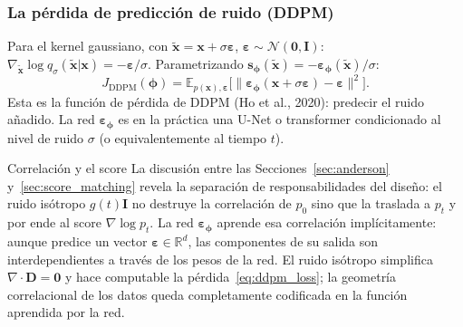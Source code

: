 \subsubsection*{La pérdida de predicción de ruido (DDPM)}

Para el kernel gaussiano, con $\tilde{\bm{x}} = \bm{x} + \sigma\bm{\varepsilon}$,
$\bm{\varepsilon}\sim\mathcal{N}(\bm{0},\bm{I})$:
$\nabla_{\tilde{\bm{x}}}\log q_\sigma(\tilde{\bm{x}}|\bm{x}) = -\bm{\varepsilon}/\sigma$.
Parametrizando $\bm{s}_{\bm{\phi}}(\tilde{\bm{x}}) =
-\bm{\varepsilon}_{\bm{\phi}}(\tilde{\bm{x}})/\sigma$:
\begin{equation}
  J_{\mathrm{DDPM}}(\bm{\phi})
  = \mathbb{E}_{p(\bm{x}),\bm{\varepsilon}}\bigl[
  \|\bm{\varepsilon}_{\bm{\phi}}(\bm{x}+\sigma\bm{\varepsilon})-\bm{\varepsilon}\|^2
  \bigr].
  \label{eq:ddpm_loss}
\end{equation}
Esta es la función de pérdida de DDPM (Ho et al., 2020): predecir el ruido
añadido. La red $\bm{\varepsilon}_{\bm{\phi}}$ es en la práctica una U-Net o
transformer condicionado al nivel de ruido $\sigma$ (o equivalentemente al
tiempo $t$).

\begin{observacion}{Correlación y el score}
La discusión entre las Secciones~\ref{sec:anderson} y~\ref{sec:score_matching}
revela la separación de responsabilidades del diseño: el ruido isótropo $g(t)\bm{I}$
no destruye la correlación de $p_0$ sino que la traslada a $p_t$ y por ende al
score $\nabla\log p_t$. La red $\bm{\varepsilon}_{\bm{\phi}}$ aprende esa
correlación implícitamente: aunque predice un vector $\bm{\varepsilon}\in
\mathbb{R}^d$, las componentes de su salida son interdependientes a través
de los pesos de la red. El ruido isótropo simplifica $\nabla\cdot\bm{D} =
\bm{0}$ y hace computable la pérdida~\eqref{eq:ddpm_loss}; la geometría
correlacional de los datos queda completamente codificada en la función
aprendida por la red.
\end{observacion}

